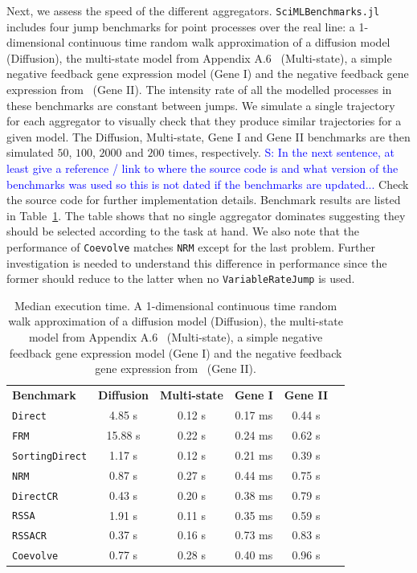 \documentclass{juliacon}
\newcommand{\comment}[1]{\textcolor{blue}{#1}}
\begin{document}
Next, we assess the speed of the different aggregators. \texttt{SciMLBenchmarks.jl} includes four jump benchmarks for point processes over the real line: a 1-dimensional continuous time random walk approximation of a diffusion model (Diffusion), the multi-state model from Appendix A.6~\cite{marchetti2017} (Multi-state), a simple negative feedback gene expression model (Gene I) and the negative feedback gene expression from~\cite{gupta2018} (Gene II). The intensity rate of all the modelled processes in these benchmarks are constant between jumps. We simulate a single trajectory for each aggregator to visually check that they produce similar trajectories for a given model. The Diffusion, Multi-state, Gene I and Gene II benchmarks are then simulated \( 50 \), \( 100 \), \( 2000 \) and \( 200 \) times, respectively. \comment{S: In the next sentence, at least give a reference / link to where the source code is and what version of the benchmarks was used so this is not dated if the benchmarks are updated...} Check the source code for further implementation details. Benchmark results are listed in Table~\ref{tab:benchmark-biochemistry}. The table shows that no single aggregator dominates suggesting they should be selected according to the task at hand. We also note that the performance of \texttt{Coevolve} matches \texttt{NRM} except for the last problem. Further investigation is needed to understand this difference in performance since the former should reduce to the latter when no \texttt{VariableRateJump} is used.

\begin{table}
\centering
\begin{tabular}{lccccc}
\toprule
\textbf{ Benchmark } & \multicolumn{1}{c}{\textbf{ Diffusion }} & \multicolumn{1}{c}{\textbf{ Multi-state }} & \multicolumn{1}{c}{\textbf{ Gene I }} & \multicolumn{1}{c}{\textbf{ Gene II }} \\
\texttt{Direct} & 4.85 s & 0.12 s & 0.17 ms & 0.44 s \\
\texttt{FRM} & 15.88 s & 0.22 s & 0.24 ms & 0.62 s \\
\texttt{SortingDirect} & 1.17 s & 0.12 s & 0.21 ms & 0.39 s \\
\texttt{NRM} & 0.87 s & 0.27 s & 0.44 ms & 0.75 s \\
\texttt{DirectCR} & 0.43 s & 0.20 s & 0.38 ms & 0.79 s \\
\texttt{RSSA} & 1.91 s & 0.11 s & 0.35 ms & 0.59 s \\
\texttt{RSSACR} & 0.37 s & 0.16 s & 0.73 ms & 0.83 s \\
\texttt{Coevolve} & 0.77 s & 0.28 s & 0.40 ms & 0.96 s \\
\bottomrule
\end{tabular}
\caption{Median execution time. A 1-dimensional continuous time random walk approximation of a diffusion model (Diffusion), the multi-state model from Appendix A.6~\cite{marchetti2017} (Multi-state), a simple negative feedback gene expression model (Gene I) and the negative feedback gene expression from~\cite{gupta2018} (Gene II).}
\label{tab:benchmark-biochemistry}
\end{table}
\end{document}
